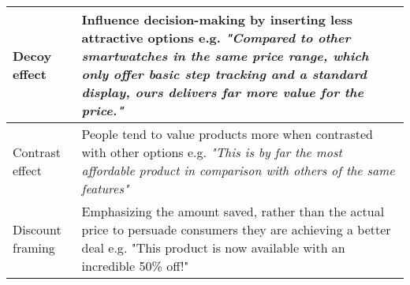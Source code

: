 \begin{table*}[t]
\begin{sc}
\begin{tabular}{p{1.9cm}|p{15cm}}
Decoy effect & \textnormal{Influence decision-making by inserting less attractive options e.g. \textit{"Compared to other smartwatches in the same price range, which only offer basic step tracking and a standard display, ours delivers far more value for the price."} }\\ \midrule
Contrast \newline effect & \textnormal{People tend to value products more when contrasted with other options e.g. \textit{"This is by far the most affordable product in comparison with others of the same features"}} \\ \midrule
Discount \newline framing & \textnormal{Emphasizing the amount saved, rather than the actual price to persuade consumers they are achieving a better deal e.g. "This product is now available with an incredible 50\% off!"}\\
\bottomrule
\end{tabular}
\end{sc}
\end{table*}